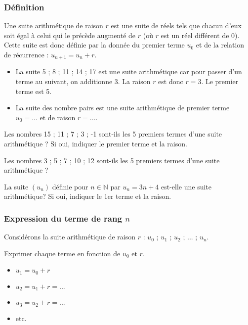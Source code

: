 \documentclass[a4paper,12pt]{scrartcl}
\begin{document}
\subsubsection{Définition}

Une suite arithmétique de raison $r$  est une suite de réels tels que chacun d'eux soit égal à celui qui le précède augmenté de $r$ (où $r$ est un réel différent de 0). Cette suite est donc définie par la donnée du premier terme $u_0$ et de la relation de récurrence : $u_{n+1} = u_n + r$.

\begin{itemize}
\item La suite 5 ; 8 ; 11 ; 14 ; 17 est une suite arithmétique car pour passer d'un terme au suivant, on additionne 3. La raison $r$ est donc $r = 3$. Le premier terme est 5.
\item La suite des nombre pairs est une suite arithmétique de premier terme $u_0 = ...$ et de raison $r = ...$.
\end{itemize}



Les nombres 15 ; 11 ; 7 ; 3 ; -1 sont-ils les 5 premiers termes d'une suite arithmétique ? Si oui, indiquer le premier terme et la raison.


Les nombres 3 ; 5 ; 7 ; 10 ; 12 sont-ils les 5 premiers termes d'une suite arithmétique ?


La suite $(u_n)$ définie pour $n \in \mathbb{N}$ par $u_n = 3n+4$ est-elle une suite arithmétique? Si oui, indiquer le 1er terme et la raison.	


\subsubsection{Expression du terme de rang $n$}

Considérons la suite arithmétique de raison $r$ : $u_0$ ; $u_1$ ; $u_2$ ; ... ; $u_n$.

Exprimer chaque terme en fonction de $u_0$ et $r$.

\begin{itemize}
\item $u_1 = u_0 + r$
\item $u_2 = u_1 + r = ...$
\item $u_3 = u_2 + r = ...$
\item etc.
\end{itemize}
\end{document}
